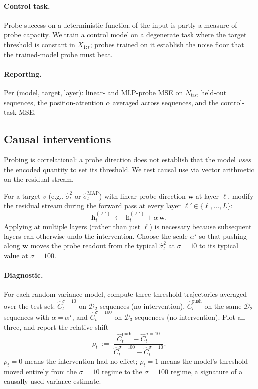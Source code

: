 \documentclass[11pt]{article}
\begin{document}
\paragraph{Control task.} Probe success on a deterministic function of the input is partly a measure of probe capacity. We  train a control model on a degenerate task where the target threshold is constant in $X_{1:t}$; probes trained on it establish the noise floor that the trained-model probe must beat.

\paragraph{Reporting.} Per (model, target, layer): linear- and MLP-probe MSE on $N_{\mathrm{test}}$ held-out sequences, the position-attention $\alpha$ averaged across sequences, and the control-task MSE.

\subsection{Causal interventions}
\label{sec:exp-intervention}

Probing is correlational: a probe direction does not establish that the model \emph{uses} the encoded quantity to set its threshold. We test causal use via vector arithmetic on the residual stream.

For a target $v$ (e.g., $\hat\sigma_t^2$ or $\hat\sigma_t^{\mathrm{MAP}}$) with linear probe direction $\mathbf{w}$ at layer $\ell$, modify the residual stream during the forward pass at every layer $\ell' \in \{\ell, \ldots, L\}$:
\[
\mathbf{h}_t^{(\ell')} \;\leftarrow\; \mathbf{h}_t^{(\ell')} + \alpha\, \mathbf{w}.
\]
Applying at multiple layers (rather than just $\ell$) is necessary because subsequent layers can otherwise undo the intervention. Choose the scale $\alpha^\star$ so that pushing along $\mathbf{w}$ moves the probe readout from the typical $\hat\sigma_t^2$ at $\sigma = 10$ to its typical value at $\sigma = 100$.

\paragraph{Diagnostic.} For each random-variance model, compute three threshold trajectories averaged over the test set: $\widehat C_t^{\sigma = 10}$ on $\mathcal{D}_2$ sequences (no intervention), $\widehat C_t^{\mathrm{push}}$ on the same $\mathcal{D}_2$ sequences with $\alpha = \alpha^\star$, and $\widehat C_t^{\sigma = 100}$ on $\mathcal{D}_3$ sequences (no intervention). Plot all three, and report the relative shift
\[
\rho_t \;:=\; \frac{\widehat C_t^{\mathrm{push}} - \widehat C_t^{\sigma = 10}}{\widehat C_t^{\sigma = 100} - \widehat C_t^{\sigma = 10}}.
\]
$\rho_t = 0$ means the intervention had no effect; $\rho_t = 1$ means the model's threshold moved entirely from the $\sigma = 10$ regime to the $\sigma = 100$ regime, a signature of a causally-used variance estimate.
\end{document}

